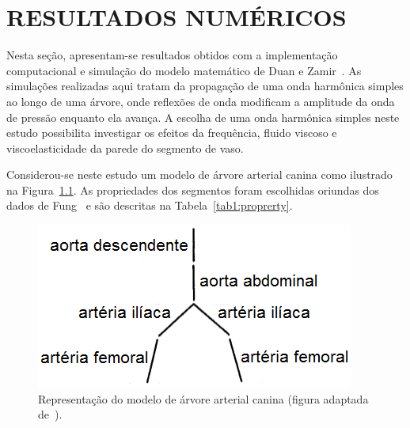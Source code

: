 \chapter{RESULTADOS NUMÉRICOS}\label{sec:resultados}
\justifying


Nesta seção, apresentam-se resultados obtidos com a implementação computacional e simulação do modelo matemático de Duan e Zamir~\cite{Duan1992}. As simulações realizadas aqui tratam da propagação de uma onda harmônica simples ao longo de uma árvore, onde reflexões de onda modificam a amplitude da onda de pressão enquanto ela avança. A escolha de uma onda harmônica simples neste estudo possibilita investigar os efeitos da frequência, fluido viscoso e viscoelasticidade da parede do segmento de vaso.

Considerou-se neste estudo um modelo de árvore arterial canina como ilustrado na Figura~\ref{fig:arvore-canina}. As propriedades dos segmentos foram escolhidas oriundas dos dados de Fung~\cite{fung2013biomechanics} e são descritas na Tabela~\ref{tab1:proprerty}. 

\begin{figure}[!htbp]
	\centering
	\includegraphics[scale=0.8]{Figures/tree_canine.png}
	\caption{Representação do modelo de árvore arterial canina (figura adaptada de~\cite{Duan}).}
	\label{fig:arvore-canina}
\end{figure}

